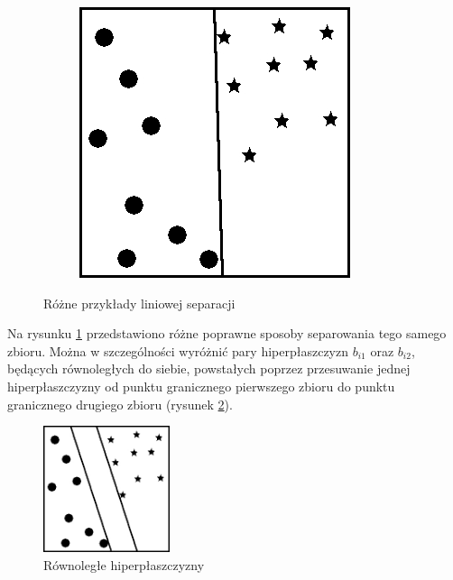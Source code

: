 \begin{figure}[h!]
\begin{subfigure}[b]{0.33\textwidth}
    \end{subfigure}%
    \begin{subfigure}[b]{0.33\textwidth}
        \includegraphics[width=\linewidth]{img/granica_3.jpg}
    \end{subfigure}
    \caption{Różne przykłady liniowej separacji}
    \label{fig:liniowa_separacja}
\end{figure}

Na rysunku \ref{fig:liniowa_separacja} przedstawiono różne poprawne sposoby separowania tego samego zbioru. Można w szczególności wyróżnić pary hiperpłaszczyzn $b_{i1}$ oraz $b_{i2}$, będących równoległych do 
siebie, powstałych poprzez przesuwanie jednej hiperpłaszczyzny od punktu granicznego pierwszego zbioru do punktu granicznego drugiego zbioru (rysunek \ref{fig:rownolegla_separacja}).
\newpage
\begin{figure}[h!]
    \centering
    \includegraphics[width=0.33\textwidth]{img/granica_rownolegla.jpg}
    \caption{Równoległe hiperpłaszczyzny}
    \label{fig:rownolegla_separacja}
\end{figure}

